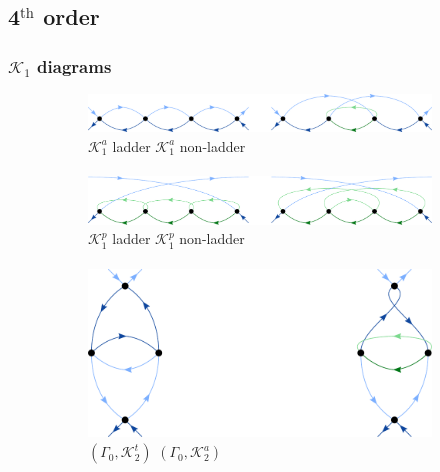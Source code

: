 \documentclass[10pt]{scrartcl}
\newcommand{\K}[2]{\mathcal{K}_#1^#2}
\begin{document}
\newpage

\subsection*{4$^\text{th}$ order}

\subsubsection*{$\mathcal{K}_1$ diagrams}

\begin{figure}[h!]
\begin{subfigure}[c]{0.4\textwidth}
\includegraphics[scale=0.3]{diagrams/PT4_K1a}
\\
\phantom{.}\hspace{0.45cm} $\K1a$ ladder \hspace{1.5cm} $\K1a$ non-ladder
\\ \\
\includegraphics[scale=0.3]{diagrams/PT4_K1p}
\\
\phantom{.}\hspace{0.45cm} $\K1p$ ladder \hspace{1.5cm} $\K1p$ non-ladder
\\ \\
\phantom{.} \hspace{0.6cm}
\includegraphics[scale=0.3]{diagrams/PT4_K1t}
\\
\phantom{.} \hspace{0.45cm} $(\Gamma_0,\K2t)$ \hspace{2.1cm} $(\Gamma_0,\K2a)$

\end{subfigure}
\end{figure}
\end{document}
